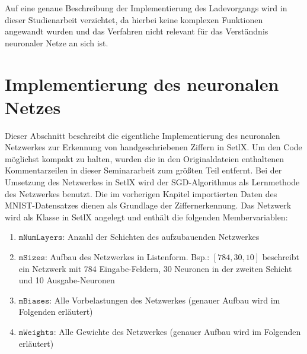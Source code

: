 \noindent
Auf eine genaue Beschreibung der Implementierung des Ladevorgangs wird in dieser Studienarbeit verzichtet, da hierbei keine komplexen Funktionen angewandt wurden und das Verfahren nicht relevant für das Verständnis neuronaler Netze an sich ist.

\section{Implementierung des neuronalen Netzes}
Dieser Abschnitt beschreibt die eigentliche Implementierung des neuronalen Netzwerkes zur Erkennung von handgeschriebenen Ziffern in SetlX. Um den Code möglichst kompakt zu halten, wurden die in den Originaldateien enthaltenen Kommentarzeilen in dieser Seminararbeit zum größten Teil entfernt.
Bei der Umsetzung des Netzwerkes in SetlX wird der SGD-Algorithmus als Lernmethode des Netzwerkes benutzt. Die im vorherigen Kapitel importierten Daten des MNIST-Datensatzes dienen als Grundlage der Ziffernerkennung. 
Das Netzwerk wird als Klasse in SetlX angelegt und enthält die folgenden Membervariablen:

\begin{enumerate}
\item $\mathtt{mNumLayers}$: Anzahl der Schichten des aufzubauenden Netzwerkes 
\item $\mathtt{mSizes}$: Aufbau des Netzwerkes in Listenform. Bsp.: $[784, 30, 10]$ beschreibt ein Netzwerk mit 784 Eingabe-Feldern, 30 Neuronen in der zweiten Schicht und 10 Ausgabe-Neuronen
\item $\mathtt{mBiases}$: Alle Vorbelastungen des Netzwerkes (genauer Aufbau wird im Folgenden erläutert)
\item $\mathtt{mWeights}$: Alle Gewichte des Netzwerkes (genauer Aufbau wird im Folgenden erläutert)
\end{enumerate}

